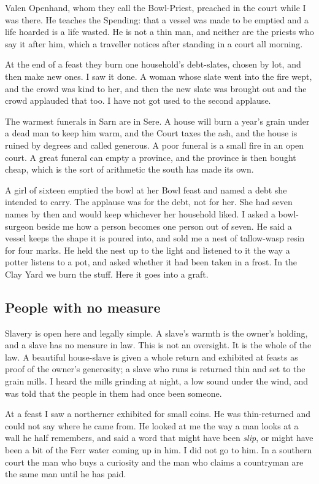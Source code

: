 \documentclass{design/chronicle}
\begin{document}
Valen Openhand, whom they call the Bowl-Priest, preached in the court while I was there. He teaches the Spending: that a vessel was made to be emptied and a life hoarded is a life wasted. He is not a thin man, and neither are the priests who say it after him, which a traveller notices after standing in a court all morning.

At the end of a feast they burn one household’s debt-slates, chosen by lot, and then make new ones. I saw it done. A woman whose slate went into the fire wept, and the crowd was kind to her, and then the new slate was brought out and the crowd applauded that too. I have not got used to the second applause.

The warmest funerals in Sarn are in Sere. A house will burn a year’s grain under a dead man to keep him warm, and the Court taxes the ash, and the house is ruined by degrees and called generous. A poor funeral is a small fire in an open court. A great funeral can empty a province, and the province is then bought cheap, which is the sort of arithmetic the south has made its own.

A girl of sixteen emptied the bowl at her Bowl feast and named a debt she intended to carry. The applause was for the debt, not for her. She had seven names by then and would keep whichever her household liked. I asked a bowl-surgeon beside me how a person becomes one person out of seven. He said a vessel keeps the shape it is poured into, and sold me a nest of tallow-wasp resin for four marks. He held the nest up to the light and listened to it the way a potter listens to a pot, and asked whether it had been taken in a frost. In the Clay Yard we burn the stuff. Here it goes into a graft.

\subsection*{People with no measure}

Slavery is open here and legally simple. A slave’s warmth is the owner’s holding, and a slave has no measure in law. This is not an oversight. It is the whole of the law. A beautiful house-slave is given a whole return and exhibited at feasts as proof of the owner’s generosity; a slave who runs is returned thin and set to the grain mills. I heard the mills grinding at night, a low sound under the wind, and was told that the people in them had once been someone.

At a feast I saw a northerner exhibited for small coins. He was thin-returned and could not say where he came from. He looked at me the way a man looks at a wall he half remembers, and said a word that might have been \emph{slip}, or might have been a bit of the Ferr water coming up in him. I did not go to him. In a southern court the man who buys a curiosity and the man who claims a countryman are the same man until he has paid.
\end{document}
